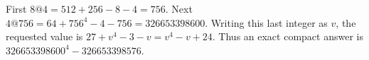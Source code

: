 First $ 8@4=512+256-8-4=756 $. Next $ 4@756=64+756^4-4-756=326653398600 $. Writing this last integer as $ v $, the requested value is $ 27+v^4-3-v=v^4-v+24 $. Thus an exact compact answer is $\boxed{326653398600^4-326653398576}$.

